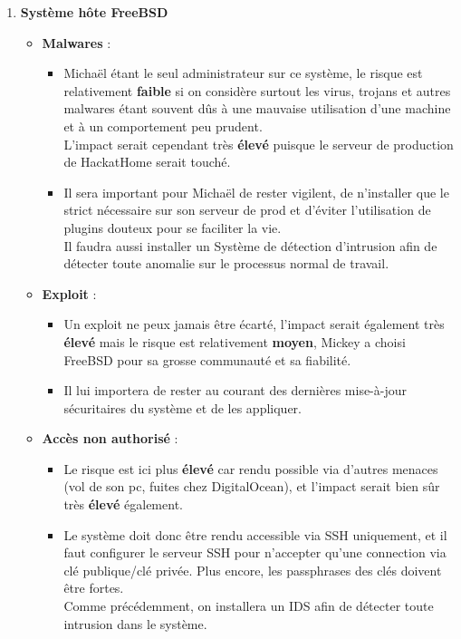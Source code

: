 \documentclass[a4paper,10pt,final,fleqn]{article}
\begin{document}
\begin{enumerate}
					\item \textbf{Système hôte FreeBSD}

						\begin{itemize}
							\item \textbf{Malwares} : \\

								\begin{itemize}
									\item Michaël étant le seul administrateur sur ce système, le risque est relativement \textbf{faible} si on considère surtout les virus, trojans et autres malwares étant souvent dûs à une mauvaise utilisation d'une machine et à un comportement peu prudent.\\ L'impact serait cependant très \textbf{élevé} puisque le serveur de production de HackatHome serait touché.
									\item Il sera important pour Michaël de rester vigilent, de n'installer que le strict nécessaire sur son serveur de prod et d'éviter l'utilisation de plugins douteux pour se faciliter la vie.\\ Il faudra aussi installer un Système de détection d'intrusion afin de détecter toute anomalie sur le processus normal de travail.\\
								\end{itemize}

							\item \textbf{Exploit} : \\

								\begin{itemize}
									\item Un exploit ne peux jamais être écarté, l'impact serait également très \textbf{élevé} mais le risque est relativement \textbf{moyen}, Mickey a choisi FreeBSD pour sa grosse communauté et sa fiabilité.\\
									\item Il lui importera de rester au courant des dernières mise-à-jour sécuritaires du système et de les appliquer.\\
								\end{itemize}
							
							\item \textbf{Accès non authorisé } : \\

								\begin{itemize}
									\item Le risque est ici plus \textbf{élevé} car rendu possible via d'autres menaces (vol de son pc, fuites chez DigitalOcean), et l'impact serait bien sûr très \textbf{élevé} également.\\
									\item Le système doit donc être rendu accessible via SSH uniquement, et il faut configurer le serveur SSH pour n'accepter qu'une connection via clé publique/clé privée. Plus encore, les passphrases des clés doivent être fortes.\\
									Comme précédemment, on installera un IDS afin de détecter toute intrusion dans le système.
								\end{itemize}



\end{itemize}
\end{enumerate}
\end{document}
